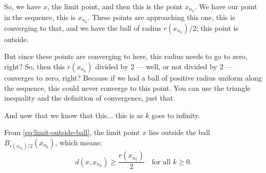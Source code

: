 \begin{proofWrapper}
\begin{speech}[00:06:15 - 00:07:35]
So, we have $x$, the limit point, and then this is the point $x_{n_k}$.  We have our point in the sequence, this is $x_{n_k}$. These points are approaching this one, this is converging to that, and we have the ball of radius $r(x_{n_k})/2$; this point is outside.

But since these points are converging to here, this radius needs to go to zero, right? So, then this $r(x_{n_k})$ divided by $2$ --- well, or not divided by $2$ --- converges to zero,  right? Because if we had a ball of positive radius uniform along the sequence, this could never converge to this point. You can use the triangle inequality and the definition of convergence, just that.

And now that we know that this... this is as $k$ goes to infinity. 
\end{speech}

\begin{content}
From \eqref{eq:limit-outside-ball}, the limit point $x$ lies outside the ball $B_{r(x_{n_k})/2}(x_{n_k})$, which means:
\begin{equation}\label{eq:dist-lower-bound}
d(x, x_{n_k}) \ge \frac{r(x_{n_k})}{2} \quad \text{for all } k \ge 0.
\end{equation}

\begin{center}
\end{center}
\end{content}
\end{proofWrapper}
